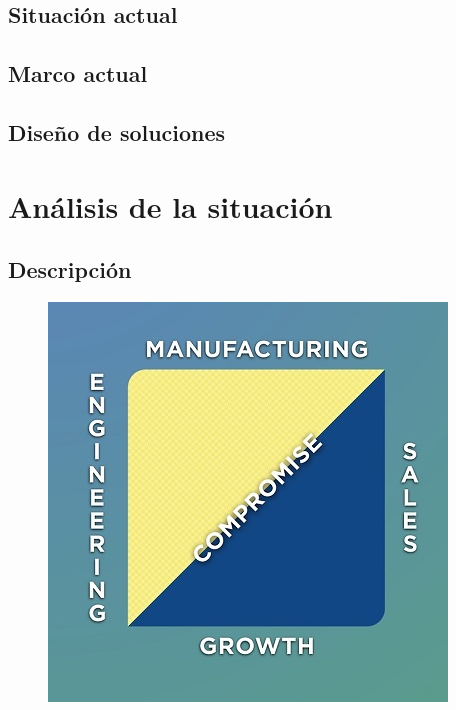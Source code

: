 \documentclass[12pt]{report} %
\begin{document}
\section{Situación actual}
\lipsum[10-13]

\section{Marco actual}
\lipsum[8-9]

\section{Diseño de soluciones}
\lipsum[4-5]


\chapter{Análisis de la situación}

\section{Descripción}
\lipsum[19]
\begin{figure}[H]
	{\includegraphics[scale=0.6]{success.jpg}}
\end{figure}

\lipsum[9-10]
\end{document}
